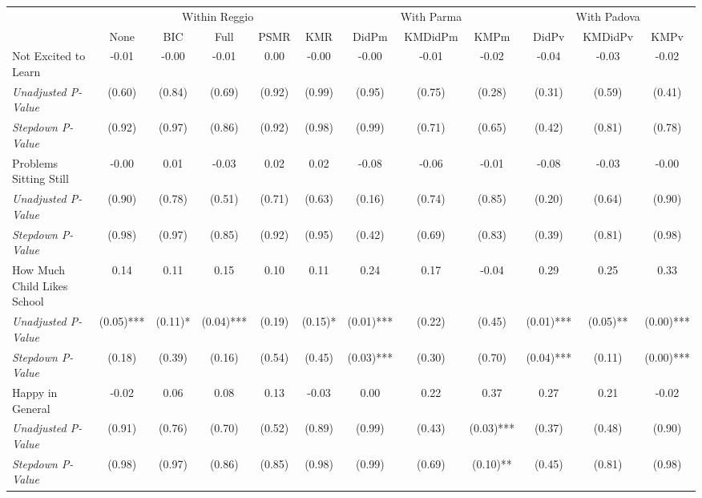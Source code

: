 \begin{tabular}{l c c c c c c c c c c c}
\toprule
& \multicolumn{5}{c}{Within Reggio} & \multicolumn{3}{c}{With Parma} & \multicolumn{3}{c}{With Padova} \\\cmidrule(lr){2-6} \cmidrule(lr){7-9} \cmidrule(lr){10-12}
 & None & BIC & Full & PSMR & KMR & DidPm & KMDidPm & KMPm & DidPv & KMDidPv & KMPv \\
\midrule
Not Excited to Learn & -0.01 & -0.00 & -0.01 & 0.00 & -0.00 & -0.00 & -0.01 & -0.02 & -0.04 & -0.03 & -0.02 \\
\quad \textit{Unadjusted P-Value} & (0.60) & (0.84) & (0.69) & (0.92) & (0.99) & (0.95) & (0.75) & (0.28) & (0.31) & (0.59) & (0.41) \\
\quad \textit{Stepdown P-Value} & (0.92) & (0.97) & (0.86) & (0.92) & (0.98) & (0.99) & (0.71) & (0.65) & (0.42) & (0.81) & (0.78) \\
Problems Sitting Still & -0.00 & 0.01 & -0.03 & 0.02 & 0.02 & -0.08 & -0.06 & -0.01 & -0.08 & -0.03 & -0.00 \\
\quad \textit{Unadjusted P-Value} & (0.90) & (0.78) & (0.51) & (0.71) & (0.63) & (0.16) & (0.74) & (0.85) & (0.20) & (0.64) & (0.90) \\
\quad \textit{Stepdown P-Value} & (0.98) & (0.97) & (0.85) & (0.92) & (0.95) & (0.42) & (0.69) & (0.83) & (0.39) & (0.81) & (0.98) \\
How Much Child Likes School & 0.14 & 0.11 & 0.15 & 0.10 & 0.11 & 0.24 & 0.17 & -0.04 & 0.29 & 0.25 & 0.33 \\
\quad \textit{Unadjusted P-Value} & (0.05)*** & (0.11)* & (0.04)*** & (0.19) & (0.15)* & (0.01)*** & (0.22) & (0.45) & (0.01)*** & (0.05)** & (0.00)*** \\
\quad \textit{Stepdown P-Value} & (0.18) & (0.39) & (0.16) & (0.54) & (0.45) & (0.03)*** & (0.30) & (0.70) & (0.04)*** & (0.11) & (0.00)*** \\
Happy in General & -0.02 & 0.06 & 0.08 & 0.13 & -0.03 & 0.00 & 0.22 & 0.37 & 0.27 & 0.21 & -0.02 \\
\quad \textit{Unadjusted P-Value} & (0.91) & (0.76) & (0.70) & (0.52) & (0.89) & (0.99) & (0.43) & (0.03)*** & (0.37) & (0.48) & (0.90) \\
\quad \textit{Stepdown P-Value} & (0.98) & (0.97) & (0.86) & (0.85) & (0.98) & (0.99) & (0.69) & (0.10)** & (0.45) & (0.81) & (0.98) \\
\bottomrule
\end{tabular}
